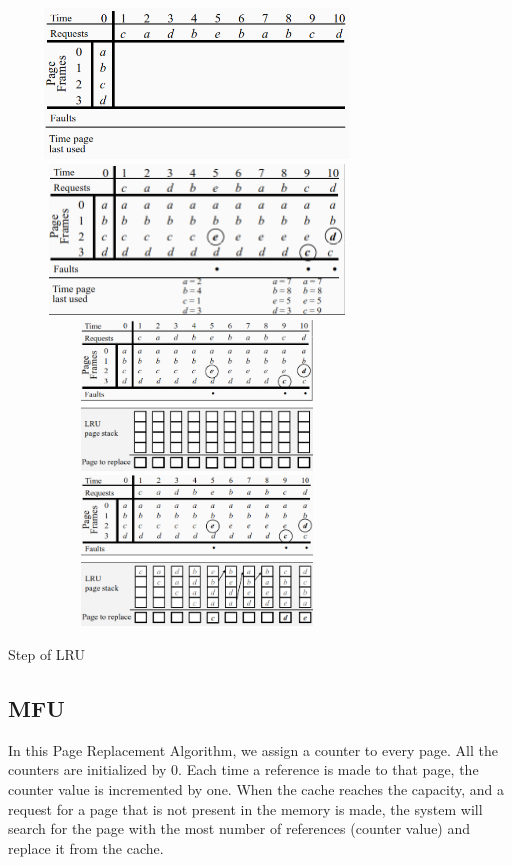 \documentclass[12pt]{article}
\begin{document}
		\centering\includegraphics[width=10cm,height=4cm]{LRU_1}\\
		\centering\includegraphics[width=10cm,height=4cm]{LRU_2}\\
		\centering\includegraphics[width=10cm,height=4cm]{LRU_3}\\
		\centering\includegraphics[width=10cm,height=4cm]{LRU_4}\\
		\begin{center}
			Step of LRU
		\end{center}
		\pagebreak
		\begin{flushleft}
			\subsection{MFU}
			In this Page Replacement Algorithm, we assign a counter to every page. All the counters are initialized by 0. Each time a reference is made to that page, the counter value is incremented by one. When the cache reaches the capacity, and a request for a page that is not present in the memory is made, the system will search for the page with the most number of references (counter value) and replace it from the cache.
		\end{flushleft}
\end{document}
